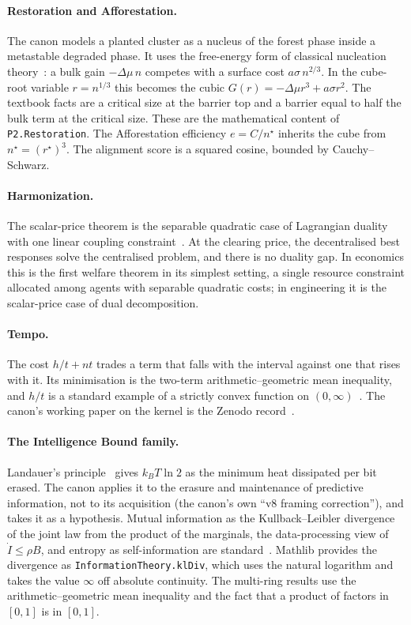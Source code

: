 \documentclass[11pt]{article}
\theoremstyle{definition}
\theoremstyle{remark}
\begin{document}
\paragraph{Restoration and Afforestation.} The canon models a planted cluster as a nucleus of the forest phase inside a
metastable degraded phase. It uses the free-energy form of classical nucleation theory~\cite{Kashchiev2000}:
a bulk gain $-\Delta\mu\, n$ competes with a surface cost $a\sigma\, n^{2/3}$.
In the cube-root variable $r=n^{1/3}$ this becomes the cubic $G(r)=-\Delta\mu r^3+a\sigma r^2$.
The textbook facts are a critical size at the barrier top and a barrier equal to half the bulk term at the critical size.
These are the mathematical content of \texttt{P2.Restoration}.
The Afforestation efficiency $e=C/n^\star$ inherits the cube from $n^\star=(r^\star)^3$.
The alignment score is a squared cosine, bounded by Cauchy--Schwarz.

\paragraph{Harmonization.} The scalar-price theorem is the separable quadratic case of Lagrangian duality with
one linear coupling constraint~\cite{BoydVandenberghe2004}.
At the clearing price, the decentralised best responses solve the centralised problem, and there is no duality gap.
In economics this is the first welfare theorem in its simplest setting, a single resource constraint allocated among
agents with separable quadratic costs; in engineering it is the scalar-price case of dual decomposition.

\paragraph{Tempo.} The cost $h/t+nt$ trades a term that falls with the interval against one that rises with it.
Its minimisation is the two-term arithmetic--geometric mean inequality, and $h/t$ is a standard example of a strictly convex
function on $(0,\infty)$~\cite{BoydVandenberghe2004}.
The canon's working paper on the kernel is the Zenodo record~\cite{HartTempo2026}.

\paragraph{The Intelligence Bound family.} Landauer's principle~\cite{Landauer1961} gives $k_BT\ln 2$ as the minimum heat
dissipated per bit erased. The canon applies it to the erasure and maintenance of predictive information, not to its
acquisition (the canon's own ``v8 framing correction''), and takes it as a hypothesis. Mutual information as the
Kullback--Leibler divergence of the joint law from the product of the marginals, the data-processing view of $\dot I\le\rho B$,
and entropy as self-information are standard~\cite{CoverThomas2006}. Mathlib provides the divergence as
\texttt{InformationTheory.klDiv}, which uses the natural logarithm and takes the value $\infty$ off absolute continuity.
The multi-ring results use the arithmetic--geometric mean inequality and the fact that a product of factors in $[0,1]$ is
in $[0,1]$.
\end{document}
